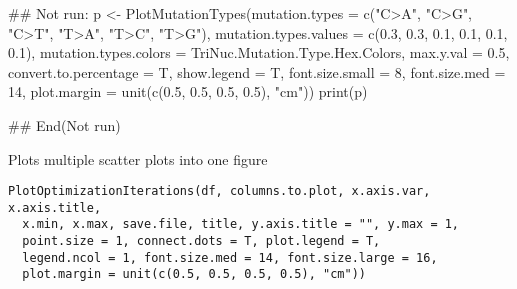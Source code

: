 \documentclass[letterpaper]{book}
\begin{document}
\begin{Examples}
\begin{ExampleCode}
## Not run: 
p <- PlotMutationTypes(mutation.types = c("C>A", "C>G", "C>T", "T>A", "T>C", "T>G"),
                  mutation.types.values = c(0.3, 0.3, 0.1, 0.1, 0.1, 0.1),
                  mutation.types.colors = TriNuc.Mutation.Type.Hex.Colors,
                  max.y.val = 0.5,
                  convert.to.percentage = T,
                  show.legend = T,
                  font.size.small = 8,
                  font.size.med = 14,
                  plot.margin = unit(c(0.5, 0.5, 0.5, 0.5), "cm"))
print(p)

## End(Not run)
\end{ExampleCode}
\end{Examples}
%
\begin{Description}\relax
Plots multiple scatter plots into one figure
\end{Description}
%
\begin{Usage}
\begin{verbatim}
PlotOptimizationIterations(df, columns.to.plot, x.axis.var, x.axis.title,
  x.min, x.max, save.file, title, y.axis.title = "", y.max = 1,
  point.size = 1, connect.dots = T, plot.legend = T,
  legend.ncol = 1, font.size.med = 14, font.size.large = 16,
  plot.margin = unit(c(0.5, 0.5, 0.5, 0.5), "cm"))
\end{verbatim}
\end{Usage}
%
\end{document}
